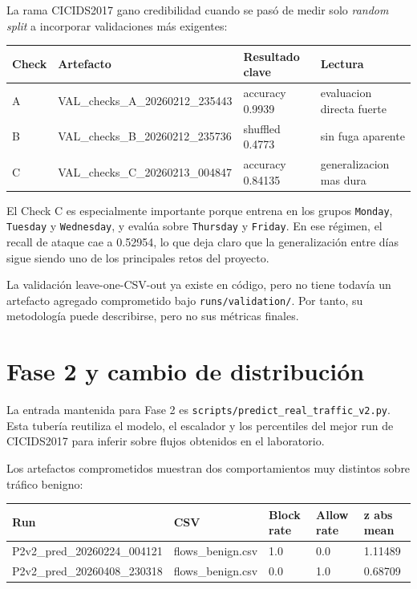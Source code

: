\documentclass[12pt,a4paper]{report}
\begin{document}
La rama CICIDS2017 gano credibilidad cuando se pasó de medir solo \emph{random split}
a incorporar validaciones más exigentes:

\begin{center}
\begin{tabular}{llll}
\toprule
Check & Artefacto & Resultado clave & Lectura \\
\midrule
A & VAL\_checks\_A\_20260212\_235443 & accuracy 0.9939 & evaluacion directa fuerte \\
B & VAL\_checks\_B\_20260212\_235736 & shuffled 0.4773 & sin fuga aparente \\
C & VAL\_checks\_C\_20260213\_004847 & accuracy 0.84135 & generalizacion mas dura \\
\bottomrule
\end{tabular}
\end{center}

El Check C es especialmente importante porque entrena en los grupos
\texttt{Monday}, \texttt{Tuesday} y \texttt{Wednesday}, y evalúa sobre
\texttt{Thursday} y \texttt{Friday}. En ese régimen, el recall de ataque cae
a 0.52954, lo que deja claro que la generalización entre días sigue siendo
uno de los principales retos del proyecto.

La validación leave-one-CSV-out ya existe en código, pero no tiene todavía
un artefacto agregado comprometido bajo \texttt{runs/validation/}. Por tanto,
su metodología puede describirse, pero no sus métricas finales.

\chapter{Fase 2 y cambio de distribución}

La entrada mantenida para Fase 2 es \texttt{scripts/predict\_real\_traffic\_v2.py}.
Esta tubería reutiliza el modelo, el escalador y los percentiles del mejor run
de CICIDS2017 para inferir sobre flujos obtenidos en el laboratorio.

Los artefactos comprometidos muestran dos comportamientos muy distintos sobre
tráfico benigno:

\begin{center}
\begin{tabular}{lllll}
\toprule
Run & CSV & Block rate & Allow rate & z abs mean \\
\midrule
P2v2\_pred\_20260224\_004121 & flows\_benign.csv & 1.0 & 0.0 & 1.11489 \\
P2v2\_pred\_20260408\_230318 & flows\_benign.csv & 0.0 & 1.0 & 0.68709 \\
\bottomrule
\end{tabular}
\end{center}
\end{document}
